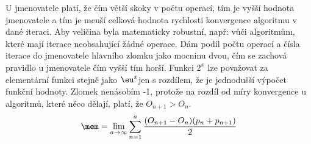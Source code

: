 \documentclass[soc]{gzwroc} %
\begin{document}
U jmenovatele platí, že čím větší skoky v počtu operací, tím je vyšší hodnota jmenovatele a tím je menší celková hodnota rychlosti konvergence algoritmu v dané iteraci. Aby veličina byla matematicky robustní, např: vůči algoritmům, které mají iterace neobsahující žádné operace. Dám podíl počtu operací a čísla iterace do jmenovatele hlavního zlomku jako mocninu dvou, čím se zachová pravidlo u jmenovatele čím vyšší tím horší. Funkci $2^x$ lze považovat za elementární funkci stejně jako $\eu^x$jen s rozdílem, že je jednodušší výpočet funkční hodnoty. Zlomek nenásobím -1, protože na rozdíl od míry konvergence u algoritmů, které něco dělají, platí, že $O_{n+1}>O_n$.
\begin{equation}
\mem=\lim_{a\to\infty} \sum_{n=1}^{a}\frac{(O_{n+1}-O_n)(p_n+p_{n+1})}{2}
\end{equation}
\end{document}
